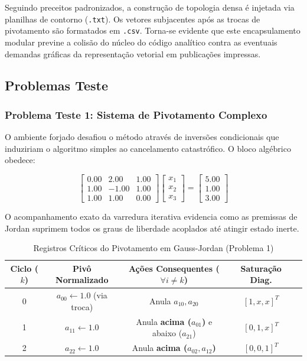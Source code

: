 Seguindo preceitos padronizados, a construção de topologia densa é injetada via planilhas de contorno (\texttt{.txt}). Os vetores subjacentes após as trocas de pivotamento são formatados em \texttt{.csv}. Torna-se evidente que este encapsulamento modular previne a colisão do núcleo do código analítico contra as eventuais demandas gráficas da representação vetorial em publicações impressas.

\subsection{Problemas Teste}

\subsubsection{Problema Teste 1: Sistema de Pivotamento Complexo}

O ambiente forjado desafiou o método através de inversões condicionais que induziriam o algoritmo simples ao cancelamento catastrófico. O bloco algébrico obedece:

\begin{equation}
\begin{bmatrix}
0.00 & 2.00 & 1.00 \\
1.00 & -1.00 & 1.00 \\
1.00 & 1.00 & 0.00
\end{bmatrix}
\begin{bmatrix}
x_1 \\
x_2 \\
x_3
\end{bmatrix}
=
\begin{bmatrix}
5.00 \\
1.00 \\
3.00
\end{bmatrix}
\end{equation}

O acompanhamento exato da varredura iterativa evidencia como as premissas de Jordan suprimem todos os graus de liberdade acoplados até atingir estado inerte.

\begin{table}[h]
\centering
\caption{Registros Críticos do Pivotamento em Gauss-Jordan (Problema 1)}
\label{tab:jordan_prob1}
\begin{tabular}{ccccc}
\hline
\textbf{Ciclo ($k$)} & \textbf{Pivô Normalizado} & \textbf{Ações Consequentes ($\forall i \neq k$)} & \textbf{Saturação Diag.} \\ \hline
0 & $a_{00} \leftarrow 1.0$ (via troca) & Anula $a_{10}, a_{20}$ & $[1, x, x]^T$ \\ 
1 & $a_{11} \leftarrow 1.0$ & Anula \textbf{acima ($a_{01}$)} e abaixo ($a_{21}$) & $[0, 1, x]^T$ \\ 
2 & $a_{22} \leftarrow 1.0$ & Anula \textbf{acima ($a_{02}, a_{12}$)} & $[0, 0, 1]^T$ \\ \hline
\end{tabular}
\end{table}

